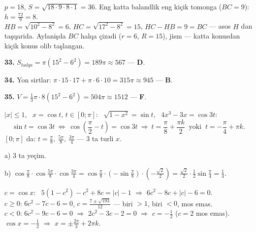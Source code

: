 \newpage
{}
$p=18$, $S=\sqrt{18\cdot9\cdot8\cdot1}=36$. Eng katta balandlik eng kiçik tomonga ($BC=9$): $h=\frac{72}9=8$.\\
$HB=\sqrt{10^2-8^2}=6$, $HC=\sqrt{17^2-8^2}=15$, $HC-HB=9=BC$ — asos $H$ dan taşqarida. Aylanişda $BC$ halqa çizadi ($r=6$, $R=15$), jism — katta konusdan kiçik konus olib taşlangan.

\textbf{33.} $S_{halqa}=\pi(15^2-6^2)=189\pi\approx567$ — \textbf{D}.

\textbf{34.} Yon sirtlar: $\pi\cdot15\cdot17+\pi\cdot6\cdot10=315\pi\approx945$ — \textbf{B}.

\textbf{35.} $V=\frac13\pi\cdot8\left(15^2-6^2\right)=504\pi\approx1512$ — \textbf{F}.

\newpage
{}
$|x|\le1$, \ $x=\cos t$, $t\in[0;\pi]$: \ $\sqrt{1-x^2}=\sin t$, \ $4x^3-3x=\cos3t$:
\[\sin t=\cos3t\ \Leftrightarrow\ \cos\left(\frac\pi2-t\right)=\cos3t\ \Rightarrow\ t=\frac\pi8+\frac{\pi k}2\ \text{ yoki }\ t=-\frac\pi4+\pi k.\]
$[0;\pi]$ da: $t=\frac\pi8,\ \frac{5\pi}8,\ \frac{3\pi}4$ — $3$ ta turli $x$.

a) $3$ ta yeçim.

b) $\cos\frac\pi8\cdot\cos\frac{5\pi}8\cdot\cos\frac{3\pi}4=\cos\frac\pi8\cdot\left(-\sin\frac\pi8\right)\cdot\left(-\frac{\sqrt2}2\right)=\frac{\sqrt2}2\cdot\frac12\sin\frac\pi4=\frac14$.

\newpage
{}
$c=\cos x$: \ $5(1-c^2)-c^2+8c=|c|-1$ $\Rightarrow$ $6c^2-8c+|c|-6=0$.\\
$c\ge0$: $6c^2-7c-6=0$, $c=\frac{7\pm\sqrt{193}}{12}$ — biri $>1$, biri $<0$, mos emas.\\
$c<0$: $6c^2-9c-6=0$ $\Rightarrow$ $2c^2-3c-2=0$ $\Rightarrow$ $c=-\frac12$ ($c=2$ mos emas).\\
$\cos x=-\frac12$ $\Rightarrow$ $x=\pm\frac{2\pi}3+2\pi k$.

